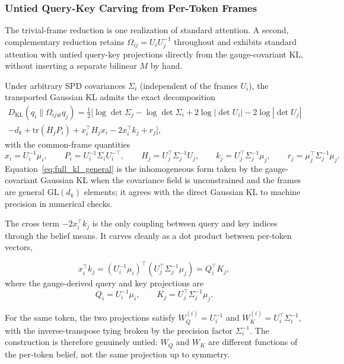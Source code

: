 \documentclass[11pt]{article}
\begin{document}
\subsubsection{Untied Query-Key Carving from Per-Token Frames}
\label{sec:untied_qk}

The trivial-frame reduction is one realization of standard attention. A second, complementary reduction retains $\Omega_{ij} = U_iU_j^{-1}$ throughout and exhibits standard attention with untied query-key projections directly from the gauge-covariant KL, without inserting a separate bilinear $M$ by hand.

Under arbitrary SPD covariances $\Sigma_i$ (independent of the frames $U_i$), the transported Gaussian KL admits the exact decomposition
\begin{multline}
D_{\mathrm{KL}}(q_i \| \Omega_{ij\#}q_j) = \tfrac{1}{2}\Big[\log\det\Sigma_j - \log\det\Sigma_i + 2\log|\det U_i| - 2\log|\det U_j| \\
 - d_k + \mathrm{tr}(H_j P_i) + x_i^\top H_j x_i - 2x_i^\top k_j + r_j\Big],
\label{eq:full_kl_general}
\end{multline}
with the common-frame quantities
\begin{equation}
x_i = U_i^{-1}\mu_i, \qquad P_i = U_i^{-1}\Sigma_i U_i^{-\top}, \qquad H_j = U_j^\top \Sigma_j^{-1} U_j, \qquad k_j = U_j^\top \Sigma_j^{-1}\mu_j, \qquad r_j = \mu_j^\top \Sigma_j^{-1}\mu_j.
\end{equation}
Equation~\eqref{eq:full_kl_general} is the inhomogeneous form taken by the gauge-covariant Gaussian KL when the covariance field is unconstrained and the frames are general $\mathrm{GL}(d_k)$ elements; it agrees with the direct Gaussian KL to machine precision in numerical checks.

The cross term $-2x_i^\top k_j$ is the only coupling between query and key indices through the belief means. It carves cleanly as a dot product between per-token vectors,

\begin{equation}
x_i^\top k_j = (U_i^{-1}\mu_i)^\top (U_j^\top \Sigma_j^{-1}\mu_j) = Q_i^\top K_j,
\label{eq:untied_cross_term}
\end{equation}
where the gauge-derived query and key projections are
\begin{equation}
\boxed{Q_i = U_i^{-1}\mu_i, \qquad K_j = U_j^\top \Sigma_j^{-1}\mu_j.}
\label{eq:gauge_qk}
\end{equation}

For the same token, the two projections satisfy $W_Q^{(i)} = U_i^{-1}$ and $W_K^{(i)} = U_i^\top \Sigma_i^{-1}$, with the inverse-transpose tying broken by the precision factor $\Sigma_i^{-1}$. The construction is therefore genuinely untied: $W_Q$ and $W_K$ are different functions of the per-token belief, not the same projection up to symmetry.
\end{document}
